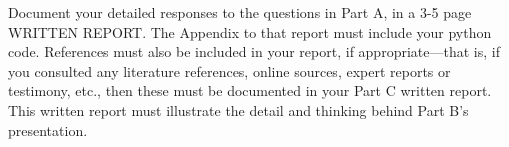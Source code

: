 Document your detailed responses to the questions in Part A, in a 3-5
page WRITTEN REPORT. The Appendix to that report must include your python code. References must also be included in your report,
if appropriate—that is, if you consulted any literature references, online
sources, expert reports or testimony, etc., then these must be documented
in your Part C written report. This written report must illustrate the detail
and thinking behind Part B’s presentation.